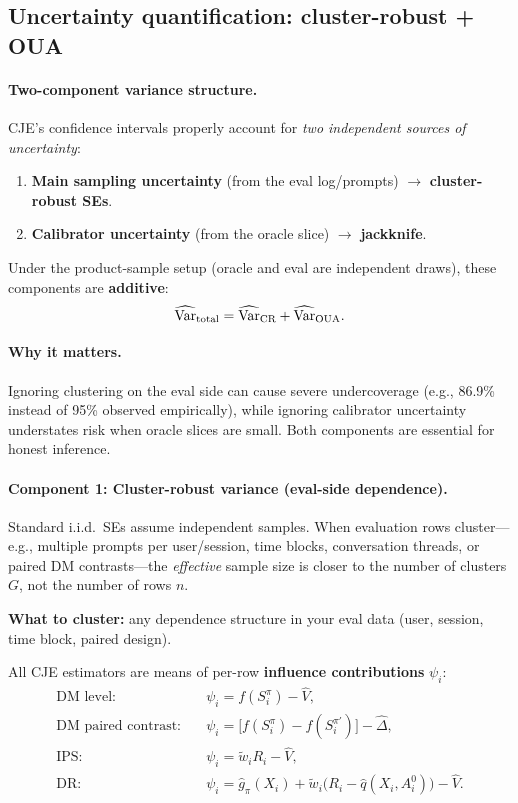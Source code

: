 \subsection{Uncertainty quantification: cluster-robust + OUA}

\paragraph{Two-component variance structure.} CJE's confidence intervals properly account for \emph{two independent sources of uncertainty}:
\begin{enumerate}
\item \textbf{Main sampling uncertainty} (from the eval log/prompts) $\to$ \textbf{cluster-robust SEs}.
\item \textbf{Calibrator uncertainty} (from the oracle slice) $\to$ \textbf{\oua{} jackknife}.
\end{enumerate}

Under the product-sample setup (oracle and eval are independent draws), these components are \textbf{additive}:
\begin{equation}
\widehat{\operatorname{Var}}_{\text{total}} = \widehat{\operatorname{Var}}_{\text{CR}} + \widehat{\operatorname{Var}}_{\text{OUA}}.
\end{equation}

\paragraph{Why it matters.} Ignoring clustering on the eval side can cause severe undercoverage (e.g., 86.9\% instead of 95\% observed empirically), while ignoring calibrator uncertainty understates risk when oracle slices are small. Both components are essential for honest inference.

\paragraph{Component 1: Cluster-robust variance (eval-side dependence).}

Standard i.i.d.\ SEs assume independent samples. When evaluation rows cluster---e.g., multiple prompts per user/session, time blocks, conversation threads, or paired DM contrasts---the \emph{effective} sample size is closer to the number of clusters $G$, not the number of rows $n$.

\textbf{What to cluster:} any dependence structure in your eval data (user, session, time block, paired design).

All CJE estimators are means of per-row \textbf{influence contributions} $\psi_i$:
\begin{align*}
\text{DM level:} \quad &\psi_i = f(S_i^\pi) - \hat{V}, \\
\text{DM paired contrast:} \quad &\psi_i = \bigl[f(S_i^\pi) - f(S_i^{\pi'})\bigr] - \widehat{\Delta}, \\
\text{IPS:} \quad &\psi_i = \tilde{w}_i R_i - \hat{V}, \\
\text{DR:} \quad &\psi_i = \hat{g}_\pi(X_i) + \tilde{w}_i\bigl(R_i - \hat{q}(X_i, A_i^0)\bigr) - \hat{V}.
\end{align*}

